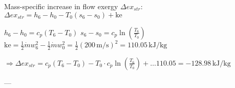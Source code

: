 Mass-specific increase in flow exergy \( \Delta ex_{str} \):  
\( \Delta ex_{str} = h_6 - h_0 - T_0 (s_6 - s_0) + \text{ke} \)  

\( h_6 - h_0 = c_p (T_6 - T_0) \)  
\( s_6 - s_0 = c_p \ln \left( \frac{T_6}{T_0} \right) \)  
\( \text{ke} = \frac{1}{2} \dot{m} w_6^2 - \frac{1}{2} \dot{m} w_0^2 = \frac{1}{2} (200 \, \text{m/s})^2 = 110.05 \, \text{kJ/kg} \)  

\( \Rightarrow \Delta ex_{str} = c_p (T_6 - T_0) - T_0 \cdot c_p \ln \left( \frac{T_6}{T_0} \right) + \dots 110.05 = -128.98 \, \text{kJ/kg} \)  

---